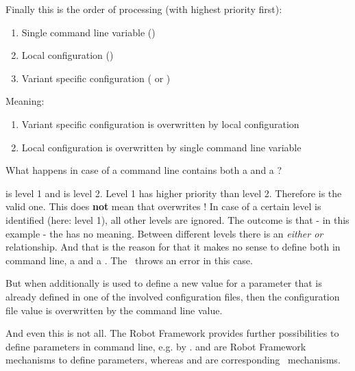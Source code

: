 \vspace{2ex}

Finally this is the order of processing (with highest priority first):

\begin{enumerate}
   \item Single command line variable ()
   \item Local configuration ()
   \item Variant specific configuration ( or )
\end{enumerate}

Meaning:

\begin{enumerate}
   \item Variant specific configuration is overwritten by local configuration
   \item Local configuration is overwritten by single command line variable
\end{enumerate}

What happens in case of a command line contains both a  and a ?

 is level 1 and  is level 2. Level 1 has higher priority than level 2. Therefore 
is the valid one. This does \textbf{not} mean that  overwrites ! In case of a certain level is identified
(here: level 1), all other levels are ignored. The outcome is that - in this example - the  has no meaning.
Between different levels there is an \textit{either or} relationship. And that is the reason for that it makes no sense to define both in command line,
a  and a . The \pkg\ throws an error in this case.

But when additionally  is used to define a new value for a parameter that is already defined in one of the involved configuration files,
then the configuration file value is overwritten by the command line value.

\vspace{2ex}

And even this is not all. The Robot Framework provides further possibilities to define parameters in command line, e.g. by
.  and  are Robot Framework mechanisms to define parameters, whereas
 and  are corresponding \pkg\ mechanisms.


